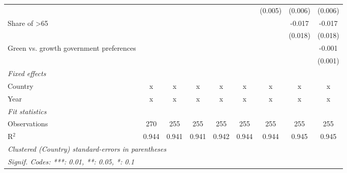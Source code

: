 \begin{table}[htbp]
\begin{tabular}{lcccccccc}
                                                       &         &         &         &         &         & (0.005) & (0.006) & (0.006)\\   
      Share of >65                                     &         &         &         &         &         &         & -0.017  & -0.017\\   
                                                       &         &         &         &         &         &         & (0.018) & (0.018)\\   
      Green vs. growth government preferences          &         &         &         &         &         &         &         & -0.001\\   
                                                       &         &         &         &         &         &         &         & (0.001)\\   
      \emph{Fixed effects}\\
      Country                                          & x       & x       & x       & x       & x       & x       & x       & x\\  
      Year                                             & x       & x       & x       & x       & x       & x       & x       & x\\  
      \midrule \emph{Fit statistics}\\
      Observations                                     & 270     & 255     & 255     & 255     & 255     & 255     & 255     & 255\\  
      R$^2$                                            & 0.944   & 0.941   & 0.941   & 0.942   & 0.944   & 0.944   & 0.945   & 0.945\\  
      \midrule
      \multicolumn{9}{l}{\emph{Clustered (Country) standard-errors in parentheses}}\\
      \multicolumn{9}{l}{\emph{Signif. Codes: ***: 0.01, **: 0.05, *: 0.1}}\\
   \end{tabular}
\end{table}


